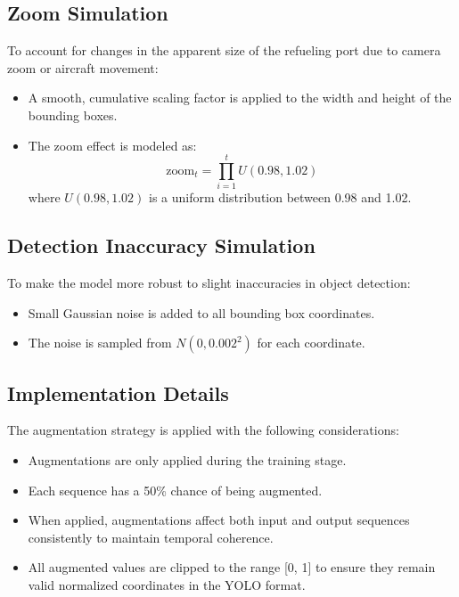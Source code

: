 \documentclass[12pt,oneside]{book} %
\begin{document}
\subsection{Zoom Simulation}

To account for changes in the apparent size of the refueling port due to camera
zoom or aircraft movement:

\begin{itemize}
    \item A smooth, cumulative scaling factor is applied to the width and height of the
          bounding boxes.
    \item The zoom effect is modeled as:
          \begin{equation}
              \text{zoom}_t = \prod_{i=1}^t U(0.98, 1.02)
          \end{equation}
          where $U(0.98, 1.02)$ is a uniform distribution between 0.98 and 1.02.
\end{itemize}

\subsection{Detection Inaccuracy Simulation}

To make the model more robust to slight inaccuracies in object detection:

\begin{itemize}
    \item Small Gaussian noise is added to all bounding box coordinates.
    \item The noise is sampled from $N(0, 0.002^2)$ for each coordinate.
\end{itemize}

\subsection{Implementation Details}

The augmentation strategy is applied with the following considerations:

\begin{itemize}
    \item Augmentations are only applied during the training stage.
    \item Each sequence has a 50\% chance of being augmented.
    \item When applied, augmentations affect both input and output sequences consistently
          to maintain temporal coherence.
    \item All augmented values are clipped to the range [0, 1] to ensure they remain
          valid normalized coordinates in the YOLO format.
\end{itemize}
\end{document}
